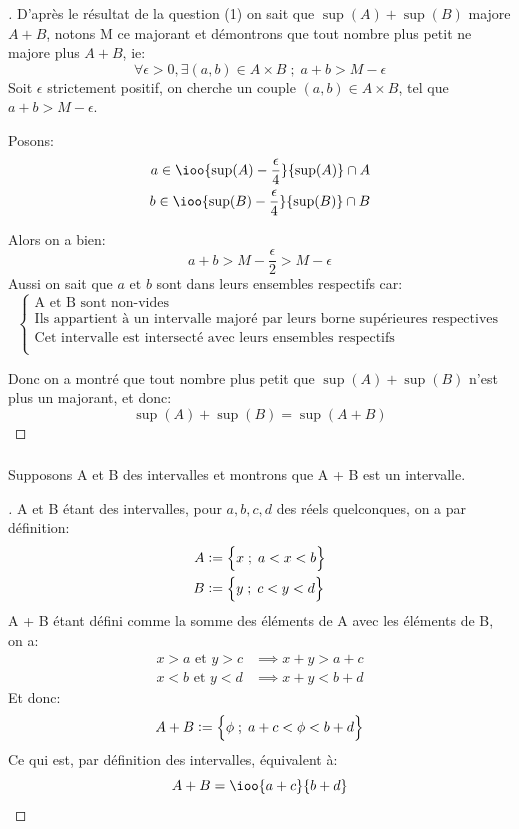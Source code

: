 \subsubsection*{}
\begin{proof}[\unskip\nopunct]
D'après le résultat de la question (1) on sait que \(\sup(A) + \sup(B)\) majore \(A + B\), notons M ce majorant et démontrons que tout nombre plus petit ne majore plus \(A + B\), ie:
\[
   \forall \epsilon > 0, \exists (a, b) \in A \times B \; ; \; a + b > M - \epsilon   
\]
Soit \(\epsilon\) strictement positif, on cherche un couple \((a, b) \in A \times B\), tel que \(a + b > M - \epsilon\).

Posons:
\begin{alignat*}{2}
   a \in \ioo{\sup(A) - \frac{\epsilon}{4}}{\sup(A)} \cap A \\
   b \in \ioo{\sup(B) - \frac{\epsilon}{4}}{\sup(B)} \cap B
\end{alignat*}

Alors on a bien:
\[
   a + b > M - \frac{\epsilon }{2} > M - \epsilon   
\]
Aussi on sait que \(a \text{ et } b\) sont dans leurs ensembles respectifs car:
\[
   \begin{cases}
      \text{A et B sont non-vides}\\ 
      \text{Ils appartient à un intervalle majoré par leurs borne supérieures respectives}\\
      \text{Cet intervalle est intersecté avec leurs ensembles respectifs}\\    
   \end{cases}   
\]

Donc on a montré que tout nombre plus petit que \(\sup(A) + \sup(B)\) n'est plus un majorant, et donc:
\[
   \sup(A) + \sup(B) = \sup(A + B)
\]
\end{proof}

\subsubsection*{}
Supposons A et B des intervalles et montrons que A + B est un intervalle.
\begin{proof}[\unskip\nopunct]
A et B étant des intervalles, pour \(a, b, c, d\) des réels quelconques, on a par définition:
\begin{align*}
   A &:= \Bigl\{ x \; ; \; a < x < b \Bigr\} \\
   B &:= \Bigl\{ y \; ; \; c < y < d \Bigr\}  
\end{align*}
A + B étant défini comme la somme des éléments de A avec les éléments de B, on a:
\begin{align*}
   x > a \text{ et } y > c &\implies x + y > a + c \\
   x < b \text{ et } y < d &\implies x + y < b + d
\end{align*}
Et donc:
\[
   A + B := \Bigl\{ \phi \; ; \; a + c < \phi < b + d \Bigr\}
\]
Ce qui est, par définition des intervalles, équivalent à:
\[
   A + B = \ioo{a + c}{b + d}
\]
\end{proof}
\pagebreak

